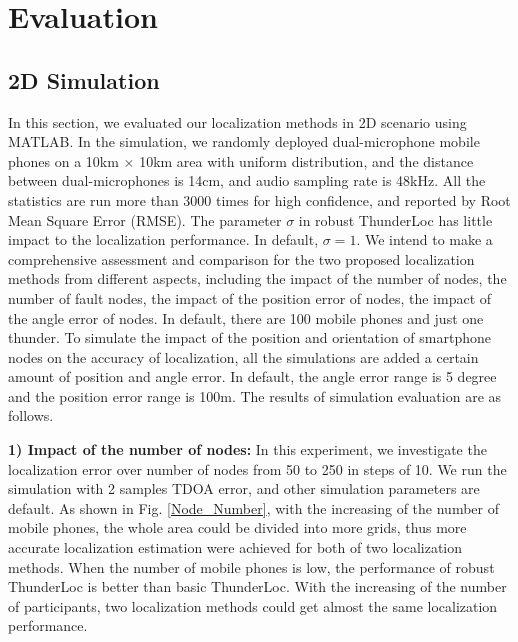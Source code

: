 
\section{Evaluation}
\label{section:results}
\subsection{2D Simulation}
In this section, we evaluated our localization methods in 2D scenario using MATLAB.  
In the simulation, we randomly deployed dual-microphone mobile phones on a 10km $\times$ 10km area with uniform distribution, and the distance between dual-microphones is 14cm, and audio sampling rate is 48kHz. 
All the statistics are run more than 3000 times for high confidence, and reported by Root Mean Square Error (RMSE).
The parameter $\sigma$ in robust ThunderLoc has little impact to the localization performance. In default, $\sigma=1$.
We intend to make a comprehensive assessment and comparison for the two proposed localization methods from different aspects, 
including the impact of the number of nodes, the number of fault nodes, the impact of the position error of nodes, the impact of the angle error of nodes. 
In default, there are 100 mobile phones and just one thunder. 
To simulate the impact of the position and orientation of smartphone nodes on the accuracy of localization, 
all the simulations are added a certain amount of position and angle error. 
In default, the angle error range is 5 degree and the position error range is 100m. 
The results of simulation evaluation are as follows.

\textbf{1) Impact of the number of nodes:}
In this experiment, we investigate the localization error over number of nodes from 50 to 250 in steps of 10. 
We run the simulation with 2 samples TDOA error, and other simulation parameters are default. 
As shown in Fig. \ref{Node_Number}, with the increasing of the number of mobile phones, the whole area could be divided into more grids, thus more accurate localization estimation were achieved for both of two localization methods. 
When the number of mobile phones is low, the performance of robust ThunderLoc is better than basic ThunderLoc. 
With the increasing of the number of participants,  two localization methods could get almost the same localization performance.
  
